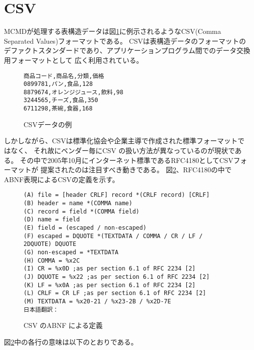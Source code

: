 
%

\section{CSV\label{sect:csv}}
MCMDが処理する表構造データは図\ref{fig:csv_exp1}に例示されるようなCSV(Comma Separated Values)フォーマットである。
CSVは表構造データのフォーマットのデファクトスタンダードであり、アプリケーションプログラム間でのデータ交換用フォーマットとして 広く利用されている。

\begin{figure}[hbt]
\begin{Verbatim}[baselinestretch=0.7,frame=single]
商品コード,商品名,分類,価格
0899781,パン,食品,128
8879674,オレンジジュース,飲料,98
3244565,チーズ,食品,350
6711298,茶碗,食器,168
\end{Verbatim}
\caption{CSVデータの例\label{fig:csv_exp1}}
\end{figure}

しかしながら、CSVは標準化協会や企業主導で作成された標準フォーマットではなく、 それ故にベンダー毎にCSV の扱い方法が異なっているのが現状である。
その中で2005年10月にインターネット標準であるRFC4180としてCSVフォーマットが 提案されたのは注目すべき動きである。
図\ref{fig:csv_abnf}、RFC4180の中でABNF表現によるCSVの定義を示す。

\begin{figure}[hbt]
\begin{Verbatim}[baselinestretch=0.7,frame=single]
(A) file = [header CRLF] record *(CRLF record) [CRLF]
(B) header = name *(COMMA name)
(C) record = field *(COMMA field)
(D) name = field
(E) field = (escaped / non-escaped)
(F) escaped = DQUOTE *(TEXTDATA / COMMA / CR / LF / 2DQUOTE) DQUOTE
(G) non-escaped = *TEXTDATA
(H) COMMA = %x2C
(I) CR = %x0D ;as per section 6.1 of RFC 2234 [2]
(J) DQUOTE = %x22 ;as per section 6.1 of RFC 2234 [2]
(K) LF = %x0A ;as per section 6.1 of RFC 2234 [2]
(L) CRLF = CR LF ;as per section 6.1 of RFC 2234 [2]
(M) TEXTDATA = %x20-21 / %x23-2B / %x2D-7E
日本語翻訳：
\end{Verbatim}
\caption{CSV のABNF による定義\label{fig:csv_abnf}}
\end{figure}

図\ref{fig:csv_abnf}中の各行の意味は以下のとおりである。

